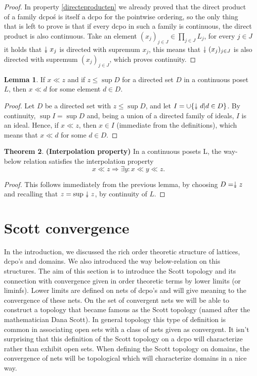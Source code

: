 \documentclass[a4paper,12pt]{article}
\newcommand{\downdownarrow}{\mathrel{\reflectbox{\rotatebox[origin=c]{90}{$\twoheadleftarrow$}}}}
\theoremstyle{definition}
\newtheorem{theorem}{Theorem}[section]
\newtheorem{lemma}[theorem]{Lemma}
\begin{document}
\begin{proof}
In property \ref{directeproducten} we already proved that the direct product of a family dcpo\'s is itself a dcpo for the pointwise ordering, so the only thing that is left to prove is that if every dcpo in such a family is continuous, the direct product is also continuous. Take an element $(x_j)_{j\in J} \in \prod_{j \in J}L_j$, for every $j \in J$ it holds that $\downdownarrow x_j$ is directed with supremum $x_j$, this means that $\downdownarrow(x_j)_{j\in J}$ is also directed with supremum $(x_j)_{j\in J}$, which proves continuity.
\end{proof}


\begin{lemma}\label{lemmavoor}
If $x \ll z$ and if $z \leq \sup D$ for a directed set $D$ in a continuous poset $L$, then $x \ll d$ for some element $d \in D$.
\end{lemma}

\begin{proof}
Let $D$ be a directed set with $z \leq \sup D$, and let $I = \cup\{\downdownarrow d | d \in D\}$. By continuity, $\sup I = \sup D$ and, being a union of a directed family of ideals, $I$ is an ideal. Hence, if $x \ll z$, then $x \in I$ (immediate from the definitions), which means that $x \ll d$ for some $d \in D$.
\end{proof}

\begin{theorem}\label{interpolation}\textbf{(Interpolation property)} In a continuous posets L, the way-below relation satisfies the interpolation property $$x \ll z \Rightarrow \exists y: x \ll y \ll z.$$
\end{theorem}
\begin{proof}
This follows immediately from the previous lemma, by choosing $D = \downdownarrow z$ and recalling that $z = \sup \downdownarrow z$, by continuity of $L$.
\end{proof}

\section{Scott convergence}
In the introduction, we discussed the rich order theoretic structure of lattices, dcpo's and domains. We also introduced the way below-relation on this structures. The aim of this section is to introduce the Scott topology and its connection with convergence given in order theoretic terms by lower limits (or liminfs). Lower limits are defined on nets of dcpo's and will give meaning to the convergence of these nets. On the set of convergent nets we will be able to construct a topology that became famous as the Scott topology  (named after the mathematician Dana Scott). In general topology this type of definition is common in associating open sets with a class of nets given as convergent. It isn't surprising that this definition of the Scott topology on a dcpo will characterize rather than exhibit open sets. When defining the Scott topology on domains, the convergence of nets will be topological which will characterize domains in a nice way.
\end{document}
